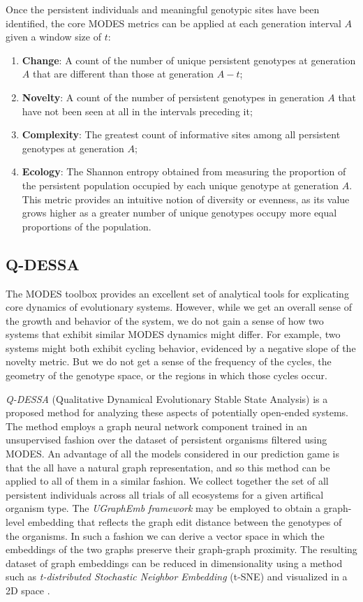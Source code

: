 \documentclass{article}
\begin{document}
Once the persistent individuals and meaningful genotypic sites have been identified, the core 
MODES metrics can be applied at each generation interval $A$ given a window size of $t$:
\begin{enumerate}
    \item \textbf{Change}: A count of the number of unique persistent genotypes at generation 
        $A$ that are different than those at generation $A - t$;
    \item \textbf{Novelty}: A count of the number of persistent genotypes in generation $A$ 
        that have not been seen at all in the intervals preceding it;
    \item \textbf{Complexity}: The greatest count of informative sites among all persistent 
        genotypes at generation $A$;
    \item \textbf{Ecology}: The Shannon entropy obtained from measuring the proportion of the 
        persistent population occupied by each unique genotype at generation $A$. This metric 
        provides an intuitive notion of diversity or evenness, as its value grows higher as a 
        greater number of unique genotypes occupy more equal proportions of the population. 
\end{enumerate}

\subsection*{Q-DESSA}
The MODES toolbox provides an excellent set of analytical tools for explicating core dynamics of 
evolutionary systems. However, while we get an overall sense of the growth and behavior of the
system, we do not gain a sense of how two systems that exhibit similar MODES dynamics might differ.
For example, two systems might both exhibit cycling behavior, evidenced by a negative slope of
the novelty metric. But we do not get a sense of the frequency of the cycles, the geometry of
the genotype space, or the regions in which those cycles occur.

\textit{Q-DESSA} (Qualitative Dynamical Evolutionary Stable State Analysis) is a proposed method for 
analyzing these aspects of potentially open-ended systems. The method employs a graph neural
network component trained in an unsupervised fashion over the dataset of persistent organisms 
filtered using MODES. An advantage of all the models considered in our prediction game is that 
the all have a natural graph representation, and so this method can be applied to all of them
in a similar fashion. We collect together the set of all persistent individuals across all trials of all
ecosystems for a given artifical organism type. The \textit{UGraphEmb framework}
\citep{Ding2019UNSUPERVISEDIW} may be employed to obtain a 
graph-level embedding that
reflects the graph edit distance between the genotypes of the organisms. In such a fashion we can
derive a vector space in which the embeddings of the two graphs preserve their graph-graph 
proximity. The resulting dataset of graph embeddings can be reduced in dimensionality using 
a method such as \textit{t-distributed Stochastic Neighbor Embedding} (t-SNE) and visualized in a 
2D space \citep{van2008visualizing}. 
\end{document}

